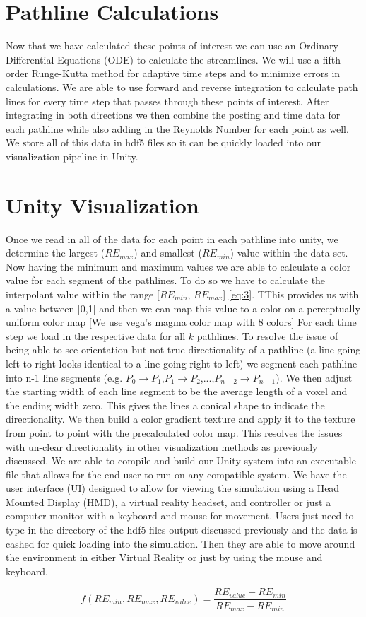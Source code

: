 \section{Pathline Calculations}


Now that we have calculated these points of interest we can use an Ordinary Differential Equations (ODE) to calculate the streamlines. We will use a fifth-order Runge-Kutta method for adaptive time steps and to minimize errors in calculations. We are able to use forward and reverse integration to calculate path lines for every time step that passes through these points of interest. After integrating in both directions we then combine the posting and time data for each pathline while also adding in the Reynolds Number for each point as well. We store all of this data in hdf5 files so it can be quickly loaded into our visualization pipeline in Unity. 


\section{Unity Visualization}
Once we read in all of the data for each point in each pathline into unity, we determine the largest (\ensuremath{RE_{max}}) and smallest (\ensuremath{RE_{min}}) value within the data set.  Now having the minimum and maximum values we are  able to calculate a color value for each segment of the pathlines. To do so we have to calculate the interpolant value within the range [\ensuremath{RE_{min}}, \ensuremath{RE_{max}}] \ref{eq:3}. TThis provides us with a value between [0,1] and then we can map this value to a color on a perceptually uniform color map \color{red} [We use  vega's magma color map with 8 colors] \color{black} For each time step we load in the respective data for all \ensuremath{k} pathlines. To resolve the issue of being able to see orientation but not true directionality of a pathline (a line going left to right looks identical to a line going right to left) we segment each pathline into n-1 line segments  (e.g. \ensuremath{P_0\rightarrow P_1},\ensuremath{P_1 \rightarrow P_2},...,\ensuremath{P_{n-2} \rightarrow P_{n-1}}).
We then adjust the starting width of each line segment to be the average length of a voxel and the ending width zero. This gives the lines a conical shape to indicate the directionality. We then build a color gradient texture and apply it to the texture from point to point with the precalculated color map. This resolves the issues with un-clear directionality in other visualization methods as previously discussed. We are able to compile and build our Unity system into an executable file that allows for the end user to run on any compatible system. We have the user interface (UI) designed to allow for viewing the simulation using a Head Mounted Display (HMD), a virtual reality headset, and controller or just a computer monitor with a keyboard and mouse for movement. Users just need to  type in the directory of the hdf5 files output discussed previously and the data is cashed for quick loading into the simulation. Then they are able to move around  the environment in either Virtual Reality or just by using the mouse and keyboard. 

\begin{equation} \label{eq:3}
f(RE_{min},RE_{max},RE_{value}) = \frac{RE_{value}-RE_{min}}{RE_{max}-RE_{min}}
\end{equation} 